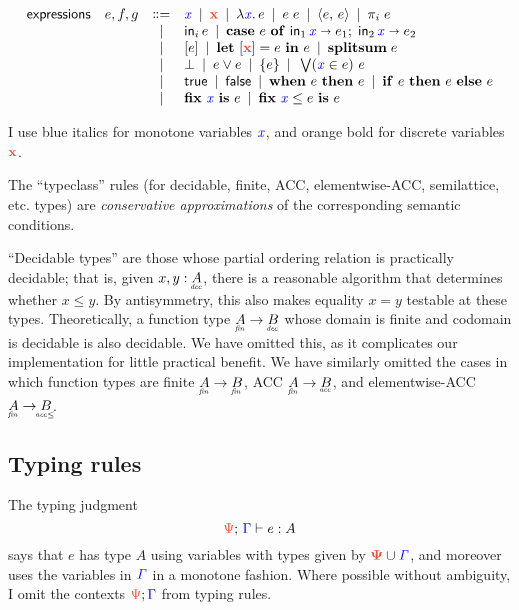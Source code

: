 \documentclass{article}
\theoremstyle{plain}
\theoremstyle{definition}
\begin{document}
\[\begin{array}{rccl}
  \textsf{expressions} & e,f,g
  &\bnfeq& \m{x} \pipe \d{x} \pipe \lam{\m{x}} e \pipe e\; e
  \pipe \pair{e}{e} \pipe \pi_i\; e\\
  &&\pipe& \inj{i}{e} \pipe \case{e}{\m{x}}{e_1}{\m{x}}{e_2}\\
  &&\pipe& \disc{e} \pipe \letdisc{\d{x}}{e}{e} \pipe \splitsum{e}\\
  &&\pipe& \unit \pipe e \vee e \pipe \single{e} \pipe \setelim{\m{x}}{e}{e}\\
  &&\pipe& \etrue \pipe \efalse \pipe \when{e}{e} \pipe \ifthen{e}{e}{e}\\
  &&\pipe& \fix{\m{x}}{e} \pipe \fixle{\m{x}}{e}{e}
\end{array}
\]

I use blue italics for monotone variables $\mathit{{\color{blue}{x}}}$, and orange bold for discrete variables $\d{x}$.

The ``typeclass'' rules (for decidable, finite, ACC, elementwise-ACC, semilattice, etc.\! types) are \emph{conservative approximations} of the corresponding semantic conditions.

``Decidable types'' are those whose partial ordering relation is practically decidable; that is, given $x, y : \eq{A}$, there is a reasonable algorithm that determines whether $x \le y$.
%
By antisymmetry, this also makes equality $x = y$ testable at these types. Theoretically, a function type $\under{fin}{A} \to \eq{B}$ whose domain is finite and codomain is decidable is also decidable.
%
We have omitted this, as it complicates our implementation for little practical
benefit.
%
We have similarly omitted the cases in which function types are finite $\fin{A} \to \fin{B}$, ACC $\fin{A} \to \acc{B}$, and elementwise-ACC $\fin{A} \to \eltacc{B}$.


\subsection{Typing rules}

The typing judgment \[\J{\GP}{\GG}{e}{A}\] says that $e$ has type $A$ using variables with types given by $\d{\GP} \cup \m{\GG}$, and moreover uses the variables in $\mathit{{\color{blue}{\Gamma}}}$ in a monotone fashion.
%
Where possible without ambiguity, I omit the contexts $\dt{\GP};\mt{\GG}$ from typing rules.
\end{document}
